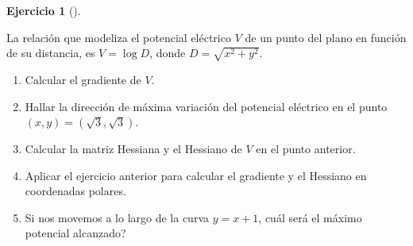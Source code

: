 \documentclass[
  a4paper,
]{scrreport}
\theoremstyle{definition}
\newtheorem{exercise}{Ejercicio}[chapter]
\theoremstyle{remark}
\begin{document}
\begin{exercise}[]\protect\hypertarget{exr-potencial-electrico}{}\label{exr-potencial-electrico}

La relación que modeliza el potencial eléctrico \(V\) de un punto del
plano en función de su distancia, es \(V=\log D\), donde
\(D=\sqrt{x^2+y^2}\).

\begin{enumerate}
\def\labelenumi{\alph{enumi}.}
\item
  Calcular el gradiente de \(V\).
\item
  Hallar la dirección de máxima variación del potencial eléctrico en el
  punto \((x,y)=(\sqrt{3},\sqrt{3})\).
\item
  Calcular la matriz Hessiana y el Hessiano de \(V\) en el punto
  anterior.
\item
  Aplicar el ejercicio anterior para calcular el gradiente y el Hessiano
  en coordenadas polares.
\item
  Si nos movemos a lo largo de la curva \(y=x+1\), cuál será el máximo
  potencial alcanzado?
\end{enumerate}

\end{exercise}
\end{document}
